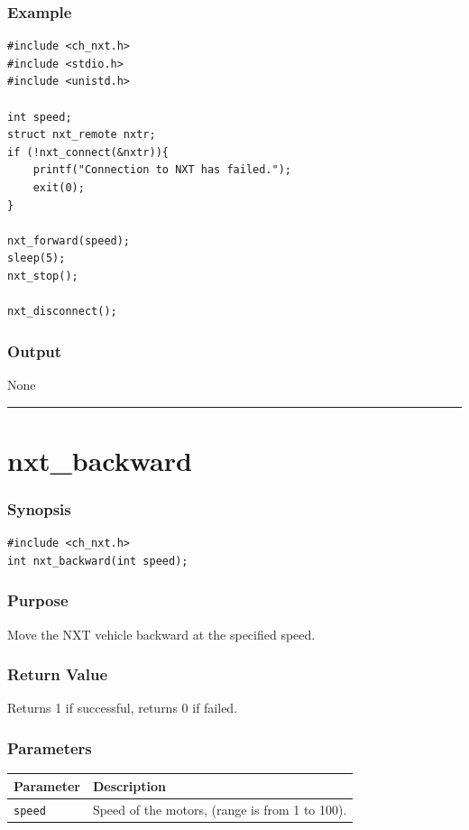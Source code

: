 \documentclass[12pt]{article}
\begin{document}
\subsubsection*{Example}
\begin{verbatim}
#include <ch_nxt.h> 
#include <stdio.h>
#include <unistd.h>

int speed;
struct nxt_remote nxtr;
if (!nxt_connect(&nxtr)){
    printf("Connection to NXT has failed.");
    exit(0);
}
    
nxt_forward(speed);
sleep(5);
nxt_stop();

nxt_disconnect();
\end{verbatim}

\subsubsection*{Output}
None 
\\

\hrule
\newpage

\section*{nxt\_backward}

\subsubsection*{Synopsis}
\begin{verbatim}
#include <ch_nxt.h>
int nxt_backward(int speed);
\end{verbatim}

\subsubsection*{Purpose}
Move the NXT vehicle backward at the specified speed.

\subsubsection*{Return Value}
Returns 1 if successful, returns 0 if failed.

\subsubsection*{Parameters}
\begin{tabular}{ l | p{12cm} }
Parameter			& Description\\ \hline
\verb+speed+	    & Speed of the motors, (range is from 1 to 100).
\end{tabular}
\end{document}
